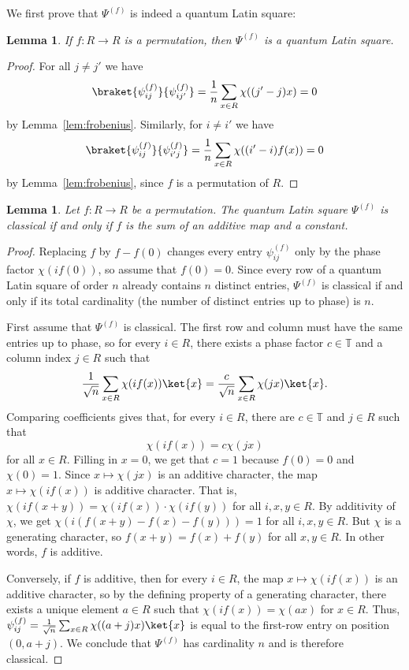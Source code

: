 \documentclass[a4paper]{article}
\newtheorem{lemma}[theorem]{Lemma}
\theoremstyle{definition}
\begin{document}
We first prove that \(\Psi^{(f)}\) is indeed a quantum Latin square:

\begin{lemma}\label{lem:construction}
If \(f:R\to R\) is a permutation, then \(\Psi^{(f)}\) is a quantum Latin square.
\end{lemma}
\begin{proof}
For all $j\neq j'$ we have
\[\braket{\psi_{ij}^{(f)}}{\psi_{ij'}^{(f)}}=\frac1n\sum_{x\in R}\chi((j'-j)x)=0\]
by Lemma~\ref{lem:frobenius}.
Similarly, for $i\neq i'$ we have
\[
\braket{\psi_{ij}^{(f)}}{\psi_{i'j}^{(f)}}=\frac1n\sum_{x\in R}\chi((i'-i)f(x))=0
\]
by Lemma~\ref{lem:frobenius}, since \(f\) is a permutation of \(R\).
\end{proof}

\begin{lemma}\label{lem:classical}
    Let \(f:R\to R\) be a permutation. The quantum Latin square \(\Psi^{(f)}\) is classical if and only if \(f\) is the sum of an additive map and a constant.
\end{lemma}
\begin{proof}
    Replacing \(f\) by \(f-f(0)\) changes every entry \(\psi_{ij}^{(f)}\) only by the phase factor \(\chi(if(0))\), so assume that \(f(0)=0\).
    Since every row of a quantum Latin square of order \(n\) already contains \(n\) distinct entries, \(\Psi^{(f)}\) is classical if and only if its total cardinality (the number of distinct entries up to phase) is \(n\).

    First assume that \(\Psi^{(f)}\) is classical. The first row and column must have the same entries up to phase, so for every \(i\in R\), there exists a phase factor \(c\in\mathbb{T}\) and a column index \(j\in R\) such that
    \[\frac1{\sqrt{n}}\sum_{x\in R}\chi(if(x))\ket{x}=\frac{c}{\sqrt{n}}\sum_{x\in R}\chi(jx)\ket{x}.\]
    Comparing coefficients gives that, for every \(i\in R\), there are \(c\in\mathbb{T}\) and \(j\in R\) such that
    \[\chi(if(x))=c\chi(jx)\]
    for all \(x\in R\).
    Filling in \(x=0\), we get that \(c=1\) because \(f(0)=0\) and \(\chi(0)=1\). 
    Since \(x\mapsto \chi(jx)\) is an additive character, the map \(x\mapsto\chi(if(x))\) is additive character. That is, \(\chi(if(x+y))=\chi(if(x))\cdot\chi(if(y))\) for all \(i,x,y\in R\). By additivity of \(\chi\), we get \(\chi(i(f(x+y)-f(x)-f(y)))=1\) for all \(i,x,y\in R\). But \(\chi\) is a generating character, so \(f(x+y)=f(x)+f(y)\) for all \(x,y\in R\). In other words, \(f\) is additive.
    
    Conversely, if \(f\) is additive, then for every \(i\in R\), the map \(x\mapsto\chi(if(x))\) is an additive character, so by the defining property of a generating character, there exists a unique element \(a\in R\) such that \(\chi(if(x))=\chi(ax)\) for \(x\in R\). Thus, \(\psi_{ij}^{(f)}=\frac1{\sqrt{n}}\sum_{x\in R}\chi((a+j)x)\ket{x}\) is equal to the first-row entry on position \((0,a+j)\). We conclude that \(\Psi^{(f)}\) has cardinality \(n\) and is therefore classical.
\end{proof}
\end{document}
